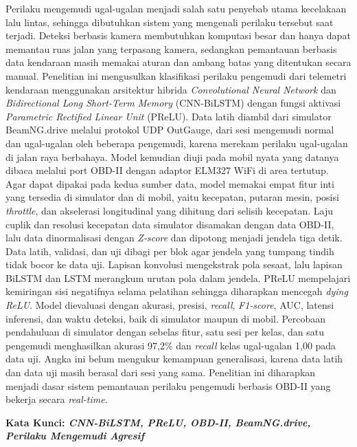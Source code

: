 Perilaku mengemudi ugal-ugalan menjadi salah satu penyebab utama kecelakaan lalu lintas, sehingga dibutuhkan sistem yang mengenali perilaku tersebut saat terjadi. Deteksi berbasis kamera membutuhkan komputasi besar dan hanya dapat memantau ruas jalan yang terpasang kamera, sedangkan pemantauan berbasis data kendaraan masih memakai aturan dan ambang batas yang ditentukan secara manual. Penelitian ini mengusulkan klasifikasi perilaku pengemudi dari telemetri kendaraan menggunakan arsitektur hibrida \textit{Convolutional Neural Network} dan \textit{Bidirectional Long Short-Term Memory} (CNN-BiLSTM) dengan fungsi aktivasi \textit{Parametric Rectified Linear Unit} (PReLU). Data latih diambil dari simulator BeamNG.drive melalui protokol UDP OutGauge, dari sesi mengemudi normal dan ugal-ugalan oleh beberapa pengemudi, karena merekam perilaku ugal-ugalan di jalan raya berbahaya. Model kemudian diuji pada mobil nyata yang datanya dibaca melalui port OBD-II dengan adaptor ELM327 WiFi di area tertutup. Agar dapat dipakai pada kedua sumber data, model memakai empat fitur inti yang tersedia di simulator dan di mobil, yaitu kecepatan, putaran mesin, posisi \textit{throttle}, dan akselerasi longitudinal yang dihitung dari selisih kecepatan. Laju cuplik dan resolusi kecepatan data simulator disamakan dengan data OBD-II, lalu data dinormalisasi dengan \textit{Z-score} dan dipotong menjadi jendela tiga detik. Data latih, validasi, dan uji dibagi per blok agar jendela yang tumpang tindih tidak bocor ke data uji. Lapisan konvolusi mengekstrak pola sesaat, lalu lapisan BiLSTM dan LSTM merangkum urutan pola dalam jendela. PReLU mempelajari kemiringan sisi negatifnya selama pelatihan sehingga diharapkan mencegah \textit{dying ReLU}. Model dievaluasi dengan akurasi, presisi, \textit{recall}, \textit{F1-score}, AUC, latensi inferensi, dan waktu deteksi, baik di simulator maupun di mobil. Percobaan pendahuluan di simulator dengan sebelas fitur, satu sesi per kelas, dan satu pengemudi menghasilkan akurasi 97,2\% dan \textit{recall} kelas ugal-ugalan 1,00 pada data uji. Angka ini belum mengukur kemampuan generalisasi, karena data latih dan data uji masih berasal dari sesi yang sama. Penelitian ini diharapkan menjadi dasar sistem pemantauan perilaku pengemudi berbasis OBD-II yang bekerja secara \textit{real-time}.

\vspace{2ex}
\noindent
\textbf{Kata Kunci: \emph{CNN-BiLSTM, PReLU, OBD-II, BeamNG.drive, Perilaku Mengemudi Agresif}}
